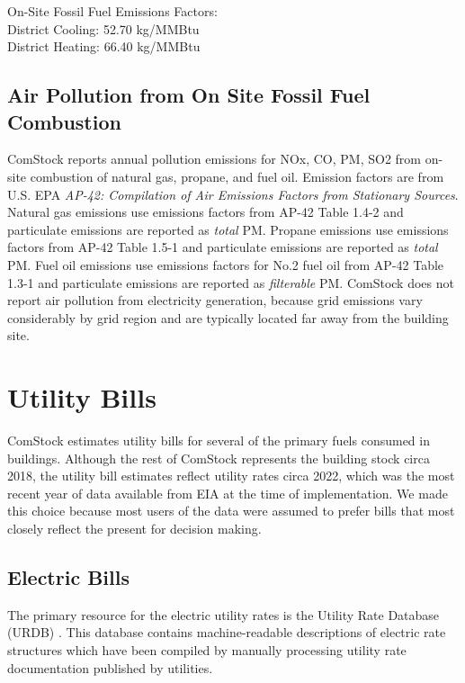 On-Site Fossil Fuel Emissions Factors:\\
District Cooling: 52.70 kg/MMBtu\\
District Heating: 66.40 kg/MMBtu\\

\subsection{Air Pollution from On Site Fossil Fuel Combustion}
ComStock reports annual pollution emissions for NOx, CO, PM, SO2 from on-site combustion of natural gas, propane, and fuel oil. Emission factors are from U.S. EPA \textit{AP-42: Compilation of Air Emissions Factors from Stationary Sources}\citep{epa_ap42}. Natural gas emissions use emissions factors from AP-42 Table 1.4-2 and particulate emissions are reported as \textit{total} PM. Propane emissions use emissions factors from AP-42 Table 1.5-1 and particulate emissions are reported as \textit{total} PM. Fuel oil emissions use emissions factors for No.2 fuel oil from AP-42 Table 1.3-1 and particulate emissions are reported as \textit{filterable} PM.
ComStock does not report air pollution from electricity generation, because grid emissions vary considerably by grid region and are typically located far away from the building site.

\section{Utility Bills}
ComStock estimates utility bills for several of the primary fuels consumed in buildings.
Although the rest of ComStock represents the building stock circa 2018, the utility bill estimates reflect utility rates
circa 2022, which was the most recent year of data available from EIA at the time of implementation. We made this choice
because most users of the data were assumed to prefer bills that most closely reflect the present for decision making.

\subsection{Electric Bills}
The primary resource for the electric utility rates is the Utility Rate Database (URDB) \citep{urdb}. This database contains machine-readable descriptions of electric rate structures which have been compiled by manually processing utility rate documentation published by utilities.

